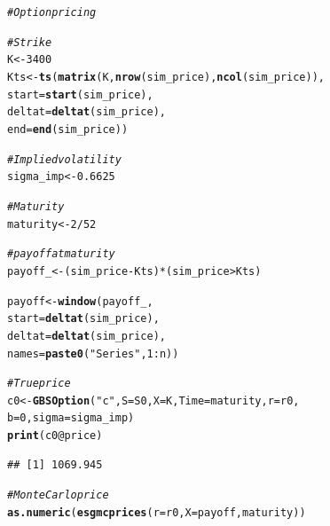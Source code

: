 \documentclass[a4paper]{article}\usepackage[]{graphicx}\usepackage[]{color}
\makeatletter
\newcommand{\hlnum}[1]{\textcolor[rgb]{0.686,0.059,0.569}{#1}}%
\newcommand{\hlstr}[1]{\textcolor[rgb]{0.192,0.494,0.8}{#1}}%
\newcommand{\hlcom}[1]{\textcolor[rgb]{0.678,0.584,0.686}{\textit{#1}}}%
\newcommand{\hlopt}[1]{\textcolor[rgb]{0,0,0}{#1}}%
\newcommand{\hlstd}[1]{\textcolor[rgb]{0.345,0.345,0.345}{#1}}%
\newcommand{\hlkwb}[1]{\textcolor[rgb]{0.69,0.353,0.396}{#1}}%
\newcommand{\hlkwc}[1]{\textcolor[rgb]{0.333,0.667,0.333}{#1}}%
\newcommand{\hlkwd}[1]{\textcolor[rgb]{0.737,0.353,0.396}{\textbf{#1}}}%
\newenvironment{kframe}{%
 \def\at@end@of@kframe{}%
 \ifinner\ifhmode%
  \def\at@end@of@kframe{\end{minipage}}%
  \begin{minipage}{\columnwidth}%
 \fi\fi%
 \def\FrameCommand##1{\hskip\@totalleftmargin \hskip-\fboxsep
 \colorbox{shadecolor}{##1}\hskip-\fboxsep
     \hskip-\linewidth \hskip-\@totalleftmargin \hskip\columnwidth}%
 \MakeFramed {\advance\hsize-\width
   \@totalleftmargin\z@ \linewidth\hsize
   \@setminipage}}%
 {\par\unskip\endMakeFramed%
 \at@end@of@kframe}
\newenvironment{knitrout}{}{} %
\makeatother
\begin{document}
\begin{knitrout}
\color{fgcolor}\begin{kframe}
\begin{alltt}
\hlcom{# Option pricing}

\hlcom{# Strike}
\hlstd{K} \hlkwb{<-} \hlnum{3400}
\hlstd{Kts} \hlkwb{<-} \hlkwd{ts}\hlstd{(}\hlkwd{matrix}\hlstd{(K,} \hlkwd{nrow}\hlstd{(sim_price),} \hlkwd{ncol}\hlstd{(sim_price)),}
               \hlkwc{start} \hlstd{=} \hlkwd{start}\hlstd{(sim_price),}
          \hlkwc{deltat} \hlstd{=} \hlkwd{deltat}\hlstd{(sim_price),}
          \hlkwc{end} \hlstd{=} \hlkwd{end}\hlstd{(sim_price))}
\end{alltt}


{\ttfamily\noindent\bfseries\color{errorcolor}{\#\# Error in nrow(sim\_price): object 'sim\_price' not found}}\begin{alltt}
\hlcom{# Implied volatility}
\hlstd{sigma_imp} \hlkwb{<-} \hlnum{0.6625}

\hlcom{#Maturity}
\hlstd{maturity} \hlkwb{<-} \hlnum{2}\hlopt{/}\hlnum{52}

\hlcom{# payoff at maturity}
\hlstd{payoff_} \hlkwb{<-} \hlstd{(sim_price} \hlopt{-} \hlstd{Kts)}\hlopt{*}\hlstd{(sim_price} \hlopt{>} \hlstd{Kts)}
\end{alltt}


{\ttfamily\noindent\bfseries\color{errorcolor}{\#\# Error in eval(expr, envir, enclos): object 'sim\_price' not found}}\begin{alltt}
\hlstd{payoff} \hlkwb{<-} \hlkwd{window}\hlstd{(payoff_,}
             \hlkwc{start} \hlstd{=} \hlkwd{deltat}\hlstd{(sim_price),}
             \hlkwc{deltat} \hlstd{=} \hlkwd{deltat}\hlstd{(sim_price),}
             \hlkwc{names} \hlstd{=} \hlkwd{paste0}\hlstd{(}\hlstr{"Series "}\hlstd{,} \hlnum{1}\hlopt{:}\hlstd{n))}
\end{alltt}


{\ttfamily\noindent\bfseries\color{errorcolor}{\#\# Error in window(payoff\_, start = deltat(sim\_price), deltat = deltat(sim\_price), : object 'payoff\_' not found}}\begin{alltt}
\hlcom{# True price}
\hlstd{c0} \hlkwb{<-} \hlkwd{GBSOption}\hlstd{(}\hlstr{"c"}\hlstd{,} \hlkwc{S} \hlstd{= S0,} \hlkwc{X} \hlstd{= K,} \hlkwc{Time} \hlstd{= maturity,} \hlkwc{r} \hlstd{= r0,}
                \hlkwc{b} \hlstd{=} \hlnum{0}\hlstd{,} \hlkwc{sigma} \hlstd{= sigma_imp)}
\hlkwd{print}\hlstd{(c0}\hlopt{@}\hlkwc{price}\hlstd{)}
\end{alltt}
\begin{verbatim}
## [1] 1069.945
\end{verbatim}
\begin{alltt}
\hlcom{# Monte Carlo price}
\hlkwd{as.numeric}\hlstd{(}\hlkwd{esgmcprices}\hlstd{(}\hlkwc{r} \hlstd{= r0,} \hlkwc{X} \hlstd{= payoff, maturity))}
\end{alltt}



\end{kframe}
\end{knitrout}
\end{document}
